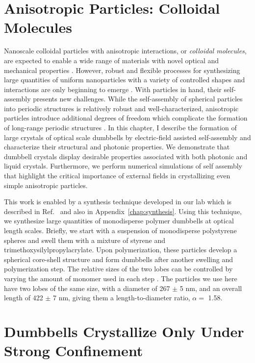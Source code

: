\section{Anisotropic Particles: Colloidal Molecules}

Nanoscale colloidal particles with anisotropic interactions, or \emph{colloidal molecules}, are expected to enable a wide range of materials with novel optical and mechanical properties \cite{Glotzer2007}.
However, robust and flexible processes for synthesizing large quantities of uniform nanoparticles with a variety of controlled shapes and interactions are only beginning to emerge \cite{Duguet2011,Park2010,Kuijk2011,Jiang2008,Perro2005}.
With particles in hand, their self-assembly presents new challenges.
While the self-assembly of spherical particles into periodic structures is relatively robust and well-characterized, anisotropic particles introduce additional degrees of freedom which complicate the formation of long-range periodic structures \cite{Lu2001,Lu2002,Hosein2010}.
In this chapter, I describe the formation of large crystals of optical scale dumbbells by electric-field assisted self-assembly and characterize their structural and photonic properties.
We demonstrate that dumbbell crystals display desirable properties associated with both photonic and liquid crystals.
Furthermore, we perform numerical simulations of self assembly that highlight the critical importance of external fields in crystallizing even simple anisotropic particles.

This work is enabled by a synthesis technique developed in our lab which is described in Ref.~\cite{Park2010} and also in Appendix~\ref{chap:synthesis}.
Using this technique, we synthesize large quantities of monodisperse polymer dumbbells at optical length scales.
Briefly, we start with a suspension of monodisperse polystyrene  spheres and swell them with a mixture of styrene and trimethoxysilylpropylacrylate.
Upon polymerization, these particles develop a spherical core-shell structure and form dumbbells after another swelling and polymerization step.
The relative sizes of the two lobes can be controlled by varying the amount of monomer used in each step \cite{Sheu1990}.
The particles we use here have two lobes of the same size, with a diameter of 267 $\pm$ 5 nm, and an overall length of 422 $\pm$ 7 nm, giving them a length-to-diameter ratio, $\alpha=$ 1.58.


\section{Dumbbells Crystallize Only Under Strong Confinement}

